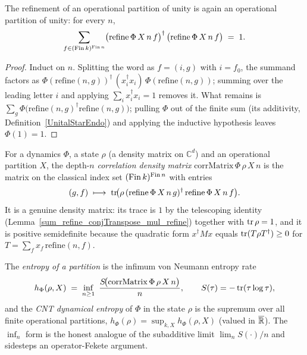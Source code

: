 \begin{lemma}\label{sum_refine_conjTranspose_mul_refine}
  \leanok
  The refinement of an operational partition of unity is again an operational partition of unity: for
  every \(n\),
  \[
    \sum_{f\in(\operatorname{Fin} k)^{\operatorname{Fin} n}}
      \bigl(\mathrm{refine}\,\Phi\,X\,n\,f\bigr)^{\dagger}\,
      \bigl(\mathrm{refine}\,\Phi\,X\,n\,f\bigr) \;=\; 1 .
  \]
\end{lemma}
\begin{proof}\leanok
  Induct on \(n\). Splitting the word as \(f=(i,g)\) with \(i=f_0\), the summand factors as
  \(\Phi(\mathrm{refine}(n,g))^{\dagger}\,(x_i^{\dagger}x_i)\,\Phi(\mathrm{refine}(n,g))\); summing over
  the leading letter \(i\) and applying \(\sum_i x_i^{\dagger}x_i=1\) removes it. What remains is
  \(\sum_g\Phi\!\bigl(\mathrm{refine}(n,g)^{\dagger}\mathrm{refine}(n,g)\bigr)\); pulling \(\Phi\) out of
  the finite sum (its additivity, Definition~\ref{UnitalStarEndo}) and applying the inductive
  hypothesis leaves \(\Phi(1)=1\).
\end{proof}

\begin{definition}\label{corrMatrix}
  \leanok
  For a dynamics \(\Phi\), a state \(\rho\) (a density matrix on \(\mathbb{C}^d\)) and an operational
  partition \(X\), the depth-\(n\) \emph{correlation density matrix}
  \(\mathrm{corrMatrix}\,\Phi\,\rho\,X\,n\) is the matrix on the classical index set
  \((\operatorname{Fin} k)^{\operatorname{Fin} n}\) with entries
  \[
    (g,f)\;\longmapsto\;
      \operatorname{tr}\!\bigl(\rho\,(\mathrm{refine}\,\Phi\,X\,n\,g)^{\dagger}\,\mathrm{refine}\,\Phi\,X\,n\,f\bigr).
  \]
  It is a genuine density matrix: its trace is \(1\) by the telescoping identity
  (Lemma~\ref{sum_refine_conjTranspose_mul_refine}) together with \(\operatorname{tr}\rho=1\), and it is positive
  semidefinite because the quadratic form \(x^{\dagger}Mx\) equals \(\operatorname{tr}(T\rho T^{\dagger})\ge 0\) for
  \(T=\sum_f x_f\,\mathrm{refine}(n,f)\).
\end{definition}

\begin{definition}\label{cntDynamicalEntropy}
  \leanok
  The \emph{entropy of a partition} is the infimum von Neumann entropy rate
  \[
    h_\Phi(\rho,X)\;=\;\inf_{n\ge 1}\ \frac{S\!\bigl(\mathrm{corrMatrix}\,\Phi\,\rho\,X\,n\bigr)}{n},
    \qquad S(\tau)=-\tr(\tau\log\tau),
  \]
  and the \emph{CNT dynamical entropy} of \(\Phi\) in the state \(\rho\) is the supremum over all
  finite operational partitions, \(h_\Phi(\rho)=\sup_{k,X}h_\Phi(\rho,X)\) (valued in
  \(\overline{\mathbb{R}}\)). The \(\inf_n\) form is the honest analogue of the subadditive limit
  \(\lim_n S(\cdot)/n\) and sidesteps an operator-Fekete argument.
\end{definition}

